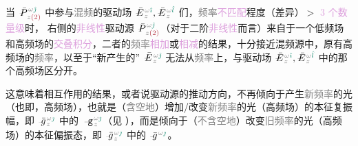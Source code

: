 当 $\xint{\mathcolor{gray}{-}}{25}{\bar{P}}^{\;\! \mathcolor{gray}{\omega} \textcolor{PineGreen}{\hat{\jmath}}}_{\;\! \mathcolor{gray}{z} \textcolor{Maroon}{(2)}}$ 中参与\textcolor{gray}{混频}的\textcolor{NavyBlue}{驱动场} $\xint{\mathcolor{gray}{-}}{25}{\bar{E}}^{\;\! \mathcolor{gray}{\omega} \textcolor{PineGreen}{\hat{\imath}}}_{\;\! \mathcolor{gray}{z}}, \xint{\mathcolor{gray}{-}}{25}{\bar{E}}^{\;\! \mathcolor{gray}{\omega} \textcolor{PineGreen}{\hat{l}}}_{\;\! \mathcolor{gray}{z}}$ 们，\textcolor{gray}{频率}\textcolor{Plum}{不匹配}程度（差异）$>$ \textcolor{Plum}{$3$ 个数量级}时， 右侧的\textcolor{Plum}{非线性}\textcolor{NavyBlue}{驱动源} $\xint{\mathcolor{gray}{-}}{25}{\bar{P}}^{\;\! \mathcolor{gray}{\omega} \textcolor{PineGreen}{\hat{\jmath}}}_{\;\! \mathcolor{gray}{z} \textcolor{Maroon}{(2)}}$（对于二阶\textcolor{Plum}{非线性}而言）来自于一个\textcolor{NavyBlue}{低频场}和\textcolor{NavyBlue}{高频场}的\textcolor{Plum}{交叠积分}，二者的\textcolor{gray}{频率}\textcolor{Plum}{相加}或\textcolor{Plum}{相减}的结果，十分接近\textcolor{NavyBlue}{混频源}中，原有\textcolor{NavyBlue}{高频场}的\textcolor{gray}{频率}，以至于“新产生的” $\xint{\mathcolor{gray}{-}}{25}{\bar{E}}^{\;\! \mathcolor{gray}{\omega} \textcolor{PineGreen}{\hat{\jmath}}}_{\;\! \mathcolor{gray}{z}}$ 无法从\textcolor{gray}{频率}上，与\textcolor{NavyBlue}{驱动场} $\xint{\mathcolor{gray}{-}}{25}{\bar{E}}^{\;\! \mathcolor{gray}{\omega} \textcolor{PineGreen}{\hat{\imath}}}_{\;\! \mathcolor{gray}{z}}, \xint{\mathcolor{gray}{-}}{25}{\bar{E}}^{\;\! \mathcolor{gray}{\omega} \textcolor{PineGreen}{\hat{l}}}_{\;\! \mathcolor{gray}{z}}$ 中的那个\textcolor{NavyBlue}{高频场}区分开。

这意味着相互作用的结果，或者说\textcolor{NavyBlue}{驱动源}的推动方向，不再倾向于产生\textcolor{gray}{新频率}的光（也即，\textcolor{NavyBlue}{高频场}），也就是（\textcolor{gray}{含空地}）增加/改变\textcolor{gray}{新频率}的光（\textcolor{NavyBlue}{高频场}）的\textcolor{PineGreen}{本征复振幅}，即 $\xint{{}^{}_{\mathcolor{gray}{-}}}{10}{\bar{g}}^{\;\!\mathcolor{gray}{\omega} \textcolor{PineGreen}{\jmath}}_{\;\! \mathcolor{gray}{z}}$ 中的 $\xint{\begin{smallmatrix} ~ \\ {}^{}_{\mathcolor{gray}{-}} \\ ~ \end{smallmatrix}}{09}{\mathtt{g}}^{\;\!\mathcolor{gray}{\omega} \textcolor{PineGreen}{\jmath}}_{\;\! \mathcolor{gray}{z}}$（见 ），而是倾向于（\textcolor{gray}{不含空地}）改变\textcolor{gray}{旧频率}的光（\textcolor{NavyBlue}{高频场}）的\textcolor{PineGreen}{本征偏振态}，即 $\xint{{}^{}_{\mathcolor{gray}{-}}}{10}{\bar{g}}^{\;\!\mathcolor{gray}{\omega} \textcolor{PineGreen}{\jmath}}_{\;\! \mathcolor{gray}{z}}$ 中的 $\xint{{}^{}_{\mathcolor{gray}{-}}}{10}{\bar{g}}^{\;\!\mathcolor{gray}{\omega} \textcolor{PineGreen}{\jmath}}$。 

